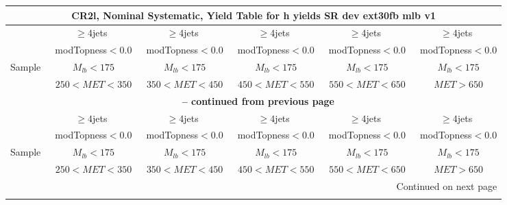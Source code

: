 \documentclass{article}
\begin{document}
\begin{longtable}{|l|c|c|c|c|c|} 
 
\multicolumn{6}{c}{ CR2l, Nominal Systematic, Yield Table for h yields SR dev ext30fb mlb v1 }\\* \hline 
  & $\ge4$jets  & $\ge4$jets  & $\ge4$jets  & $\ge4$jets  & $\ge4$jets \\* 
  & ~modTopness$<0.0$  & ~modTopness$<0.0$  & ~modTopness$<0.0$  & ~modTopness$<0.0$  & ~modTopness$<0.0$ \\* 
Sample  & ~$M_{lb}<175$  & ~$M_{lb}<175$  & ~$M_{lb}<175$  & ~$M_{lb}<175$  & ~$M_{lb}<175$ \\* 
  & ~$250<MET<350$  & ~$350<MET<450$  & ~$450<MET<550$  & ~$550<MET<650$  & ~$MET>650$ \\* 
\hline \hline 
\endfirsthead 
 
\multicolumn{6}{c}{{\bfseries \tablename\ \thetable{} -- continued from previous page}}\\* \hline 
  & $\ge4$jets  & $\ge4$jets  & $\ge4$jets  & $\ge4$jets  & $\ge4$jets \\* 
  & ~modTopness$<0.0$  & ~modTopness$<0.0$  & ~modTopness$<0.0$  & ~modTopness$<0.0$  & ~modTopness$<0.0$ \\* 
Sample  & ~$M_{lb}<175$  & ~$M_{lb}<175$  & ~$M_{lb}<175$  & ~$M_{lb}<175$  & ~$M_{lb}<175$ \\* 
  & ~$250<MET<350$  & ~$350<MET<450$  & ~$450<MET<550$  & ~$550<MET<650$  & ~$MET>650$ \\* 
\hline \hline 
\endhead 
 
\multicolumn{6}{|r|}{{Continued on next page}}\\* \hline 
\endfoot 
 
 
\endlastfoot 
 

\end{longtable}
\end{document}
